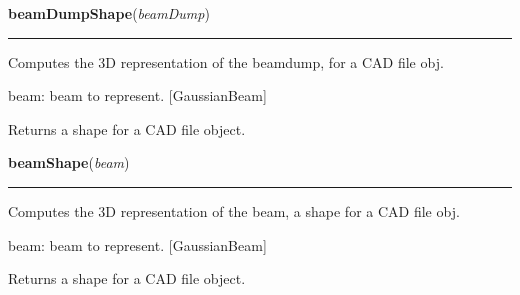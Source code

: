     \vspace{0.5ex}

\hspace{.8\funcindent}\begin{boxedminipage}{\funcwidth}

    \raggedright \textbf{beamDumpShape}(\textit{beamDump})

    \vspace{-1.5ex}

    \rule{\textwidth}{0.5\fboxrule}
\setlength{\parskip}{2ex}
    Computes the 3D representation of the beamdump, for a CAD file obj.

    beam: beam to represent. [GaussianBeam]

    Returns a shape for a CAD file object.

\setlength{\parskip}{1ex}
    \end{boxedminipage}

    \label{theia:rendering:shapes:beamShape}

    \vspace{0.5ex}

\hspace{.8\funcindent}\begin{boxedminipage}{\funcwidth}

    \raggedright \textbf{beamShape}(\textit{beam})

    \vspace{-1.5ex}

    \rule{\textwidth}{0.5\fboxrule}
\setlength{\parskip}{2ex}
    Computes the 3D representation of the beam, a shape for a CAD file obj.

    beam: beam to represent. [GaussianBeam]

    Returns a shape for a CAD file object.

\setlength{\parskip}{1ex}
    \end{boxedminipage}

